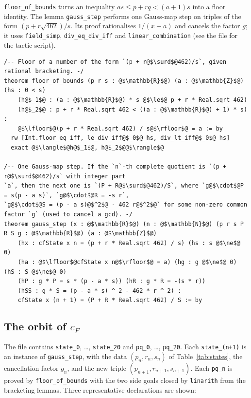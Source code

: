 \documentclass[11pt]{article}
\begin{document}
\texttt{floor\_of\_bounds} turns an inequality $as \le p + rq < (a+1)s$ into a floor identity. The
lemma \texttt{gauss\_step} performs one Gauss-map step on triples of the form $(p + r\sqrt{462})/s$.
Its proof rationalises $1/(x - a)$ and cancels the factor $g$; it uses \texttt{field\_simp},
\texttt{div\_eq\_div\_iff} and \texttt{linear\_combination} (see the file for the tactic script).

\begin{lstlisting}
/-- Floor of a number of the form `(p + r@$\surd$@462)/s`, given rational bracketing. -/
theorem floor_of_bounds (p r s : @$\mathbb{R}$@) (a : @$\mathbb{Z}$@) (hs : 0 < s)
    (h@$_1$@ : (a : @$\mathbb{R}$@) * s @$\le$@ p + r * Real.sqrt 462)
    (h@$_2$@ : p + r * Real.sqrt 462 < ((a : @$\mathbb{R}$@) + 1) * s) :
    @$\lfloor$@(p + r * Real.sqrt 462) / s@$\rfloor$@ = a := by
  rw [Int.floor_eq_iff, le_div_iff@$_0$@ hs, div_lt_iff@$_0$@ hs]
  exact @$\langle$@h@$_1$@, h@$_2$@@$\rangle$@

/-- One Gauss-map step. If the `n`-th complete quotient is `(p + r@$\surd$@462)/s` with integer part
`a`, then the next one is `(P + R@$\surd$@462)/S`, where `g@$\cdot$@P = s(p - a s)`, `g@$\cdot$@R = -s r`,
`g@$\cdot$@S = (p - a s)@$^2$@ - 462 r@$^2$@` for some non-zero common factor `g` (used to cancel a gcd). -/
theorem gauss_step (x : @$\mathbb{R}$@) (n : @$\mathbb{N}$@) (p r s P R S g : @$\mathbb{R}$@) (a : @$\mathbb{Z}$@)
    (hx : cfState x n = (p + r * Real.sqrt 462) / s) (hs : s @$\ne$@ 0)
    (ha : @$\lfloor$@cfState x n@$\rfloor$@ = a) (hg : g @$\ne$@ 0) (hS : S @$\ne$@ 0)
    (hP : g * P = s * (p - a * s)) (hR : g * R = -(s * r))
    (hSS : g * S = (p - a * s) ^ 2 - 462 * r ^ 2) :
    cfState x (n + 1) = (P + R * Real.sqrt 462) / S := by
\end{lstlisting}

\subsection{The orbit of $c_F$}

The file contains \texttt{state\_0}, \ldots, \texttt{state\_20} and \texttt{pq\_0}, \ldots,
\texttt{pq\_20}. Each \texttt{state\_(n+1)} is an instance of \texttt{gauss\_step}, with the data
$(p_n, r_n, s_n)$ of Table~\ref{tab:states}, the cancellation factor $g_n$, and the new triple
$(p_{n+1}, r_{n+1}, s_{n+1})$. Each \texttt{pq\_n} is proved by \texttt{floor\_of\_bounds} with
the two side goals closed by \texttt{linarith} from the bracketing lemmas. Three representative
declarations are shown:
\end{document}

